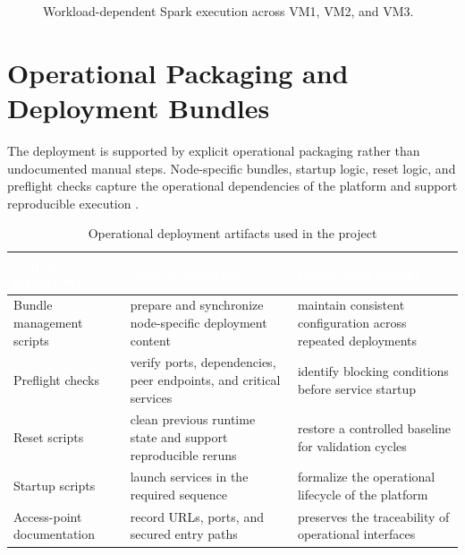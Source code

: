 \begin{figure}[H]
    \centering
    
    \caption{Workload-dependent Spark execution across VM1, VM2, and VM3.}
    \label{fig:chapter6-distributed-spark-execution}
\end{figure}

\section{Operational Packaging and Deployment Bundles}
The deployment is supported by explicit operational packaging rather than undocumented manual steps. Node-specific bundles, startup logic, reset logic, and preflight checks capture the operational dependencies of the platform and support reproducible execution \cite{docker_docs}.

\begin{table}[!htbp]
    \centering
    \footnotesize
    \renewcommand{\arraystretch}{1.16}
    \begin{tabularx}{\textwidth}{|Y|Y|Y|}
        \hline
        \textcolor{white}{\textbf{Deployment artifact type}} & \textcolor{white}{\textbf{Role in operations}} & \textcolor{white}{\textbf{Operational benefit}} \\
        \hline
        Bundle management scripts & prepare and synchronize node-specific deployment content & maintain consistent configuration across repeated deployments \\
        \hline
        Preflight checks & verify ports, dependencies, peer endpoints, and critical services & identify blocking conditions before service startup \\
        \hline
        Reset scripts & clean previous runtime state and support reproducible reruns & restore a controlled baseline for validation cycles \\
        \hline
        Startup scripts & launch services in the required sequence & formalize the operational lifecycle of the platform \\
        \hline
        Access-point documentation & record URLs, ports, and secured entry paths & preserves the traceability of operational interfaces \\
        \hline
    \end{tabularx}
    \caption{Operational deployment artifacts used in the project}
    \label{tab:chapter6-deployment-artifacts}
\end{table}

